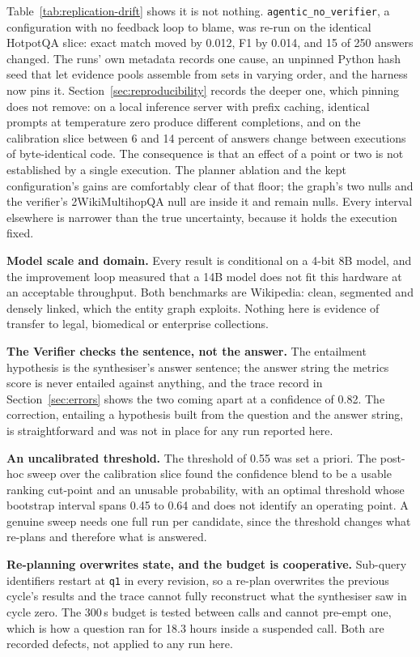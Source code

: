 Table~\ref{tab:replication-drift} shows it is not nothing.
\texttt{agentic\_no\_verifier}, a configuration with no feedback loop to
blame, was re-run on the identical HotpotQA slice: exact match moved by 0.012,
F1 by 0.014, and 15 of 250 answers changed. The runs' own metadata records one
cause, an unpinned Python hash seed that let evidence pools assemble from sets
in varying order, and the harness now pins it. Section~\ref{sec:reproducibility}
records the deeper one, which pinning does not remove: on a local inference
server with prefix caching, identical prompts at temperature zero produce
different completions, and on the calibration slice between 6 and 14 percent
of answers change between executions of byte-identical code. The consequence
is that an effect of a point or two is not established by a single execution.
The planner ablation and the kept configuration's gains are comfortably clear
of that floor; the graph's two nulls and the verifier's 2WikiMultihopQA null
are inside it and remain nulls. Every interval elsewhere is narrower than the
true uncertainty, because it holds the execution fixed.

\textbf{Model scale and domain.} Every result is conditional on a 4-bit 8B
model, and the improvement loop measured that a 14B model does not fit this
hardware at an acceptable throughput. Both benchmarks are Wikipedia: clean,
segmented and densely linked, which the entity graph exploits. Nothing here is
evidence of transfer to legal, biomedical or enterprise collections.

\textbf{The Verifier checks the sentence, not the answer.} The entailment
hypothesis is the synthesiser's answer sentence; the answer string the metrics
score is never entailed against anything, and the trace record in
Section~\ref{sec:errors} shows the two coming apart at a confidence of 0.82.
The correction, entailing a hypothesis built from the question and the answer
string, is straightforward and was not in place for any run reported here.

\textbf{An uncalibrated threshold.} The threshold of 0.55 was set a priori.
The post-hoc sweep over the calibration slice found the confidence blend to be
a usable ranking cut-point and an unusable probability, with an optimal
threshold whose bootstrap interval spans 0.45 to 0.64 and does not identify an
operating point. A genuine sweep needs one full run per candidate, since the
threshold changes what re-plans and therefore what is answered.

\textbf{Re-planning overwrites state, and the budget is cooperative.}
Sub-query identifiers restart at \texttt{q1} in every revision, so a re-plan
overwrites the previous cycle's results and the trace cannot fully reconstruct
what the synthesiser saw in cycle zero. The 300\,s budget is tested between
calls and cannot pre-empt one, which is how a question ran for 18.3 hours
inside a suspended call. Both are recorded defects, not applied to any run
here.

